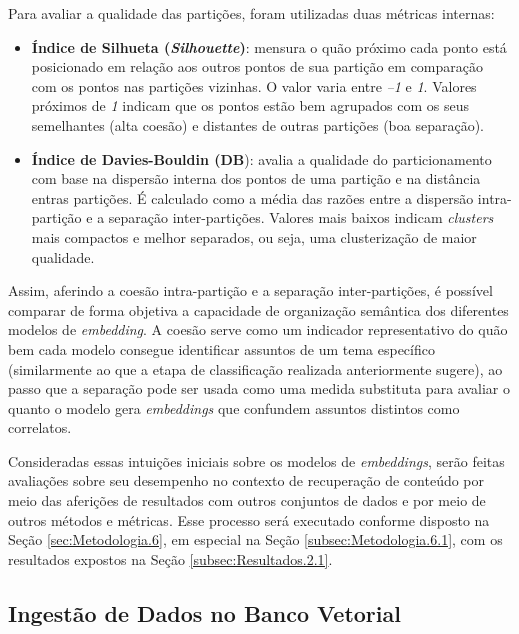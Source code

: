 Para avaliar a qualidade das partições, foram utilizadas duas métricas internas:

\begin{itemize}
    \item \textbf{Índice de Silhueta (\textit{Silhouette})}: mensura o quão próximo cada ponto está posicionado em relação aos outros pontos de sua partição em comparação com os pontos nas partições vizinhas. O valor varia entre \textit{–1} e \textit{1}. Valores próximos de \textit{1} indicam que os pontos estão bem agrupados com os seus semelhantes (alta coesão) e distantes de outras partições (boa separação).

    \item \textbf{Índice de Davies-Bouldin (DB}): avalia a qualidade do particionamento com base na dispersão interna dos pontos de uma partição e na distância entras partições. É calculado como a média das razões entre a dispersão intra-partição e a separação inter-partições. Valores mais baixos indicam \textit{clusters} mais compactos e melhor separados, ou seja, uma clusterização de maior qualidade.
\end{itemize}

Assim, aferindo a coesão intra-partição e a separação inter-partições, é possível comparar de forma objetiva a capacidade de organização semântica dos diferentes modelos de \textit{embedding}. A coesão serve como um indicador representativo do quão bem cada modelo consegue identificar assuntos de um tema específico (similarmente ao que a etapa de classificação realizada anteriormente sugere), ao passo que a separação pode ser usada como uma medida substituta para avaliar o quanto o modelo gera \textit{embeddings} que confundem assuntos distintos como correlatos.

Consideradas essas intuições iniciais sobre os modelos de \textit{embeddings}, serão feitas avaliações sobre seu desempenho no contexto de recuperação de conteúdo por meio das aferições de resultados com outros conjuntos de dados e por meio de outros métodos e métricas. Esse processo será executado conforme disposto na Seção \ref{sec:Metodologia.6}, em especial na Seção \ref{subsec:Metodologia.6.1}, com os resultados expostos na Seção \ref{subsec:Resultados.2.1}.

\subsection{Ingestão de Dados no Banco Vetorial}
\label{subsec:Metodologia.2.3}

